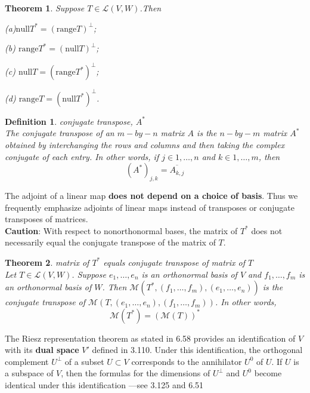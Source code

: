 \documentclass{article}
\newtheorem{theorem}{Theorem}[subsection]
\newtheorem{definition}{Definition}[subsection]
\newcommand{\range}{\text{range}}
\newcommand{\n}{\text{null}}
\begin{document}
\begin{CJK}{UTF8}{gkai}
\begin{theorem}
    Suppose $T\in\mathcal{L}(V,W)$.Then

    (a)$ \n T^\ast=(\range T)^\bot$;

    (b) $\range T^\ast=(\n T)^\bot$;

    (c) $\n T=(\range T^\ast)^\bot$;

    (d) $\range T=(\n T^\ast)^\bot$.
\end{theorem}

\begin{definition}
    conjugate transpose, $A^\ast$\\

    The conjugate transpose of an $m -by- n$ matrix $A$ is the $n-by-m$ matrix $A^\ast$ obtained by interchanging the rows and columns and then taking the complex conjugate of each entry. In other words, if $j\in{1,\ldots, n}$ and $k\in{1,\ldots,m }$, then
    \[( A^\ast)_{j,k}= \overline{A_{k,j}}\]
\end{definition}

The adjoint of a linear map \textbf{does not depend on a choice of basis}. Thus we frequently emphasize adjoints of linear maps instead of transposes or conjugate transposes of matrices.\\

\textbf{Caution}: With respect to nonorthonormal bases, the matrix of $T^\ast$ does not necessarily equal the conjugate transpose of the matrix of $T$.\\

\begin{theorem}
    matrix of $T^\ast$ equals conjugate transpose of matrix of $T$\\

    Let $T \in \mathcal{L}(V,W)$. Suppose $e_1,\ldots,e_n$ is an orthonormal basis of $V$ and $f_1, \ldots, f_m$ is an orthonormal basis of $W$. Then $\mathcal{M}(T^\ast,(f_1,\ldots, f_m ),(e_1,\ldots,e_n))$ is the conjugate transpose of $\mathcal{M}(T,(e_1,\ldots,e_n),(f_1,\ldots, f_m ))$. In other words,
    \[\mathcal{M}(T^\ast) = (\mathcal{M}(T))^\ast\]
\end{theorem}

The Riesz representation theorem as stated in 6.58 provides an identification of $V$ with its \textbf{dual space} $V'$ defined in 3.110. Under this identification, the orthogonal complement $U^\bot$ of a subset $U \subset V$ corresponds to the annihilator $U^0$ of $U$. If $U$ is a subspace of $V$, then the formulas for the dimensions of $U^\bot$ and $U^0$ become identical under this identification —see 3.125 and 6.51\\


\end{CJK}
\end{document}

